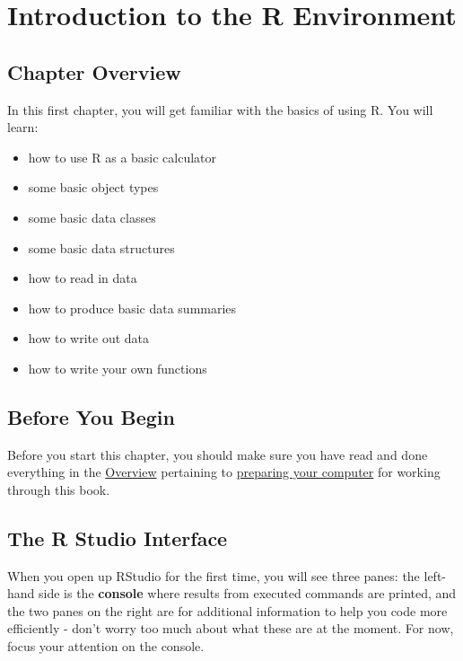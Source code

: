 \documentclass[]{book}
\providecommand{\tightlist}{%
  \setlength{\itemsep}{0pt}\setlength{\parskip}{0pt}}
\begin{document}
\hypertarget{ch1}{%
\chapter{Introduction to the R Environment}\label{ch1}}

\hypertarget{chapter-overview}{%
\section*{Chapter Overview}\label{chapter-overview}}

In this first chapter, you will get familiar with the basics of using R. You will learn:

\begin{itemize}
\tightlist
\item
  how to use R as a basic calculator
\item
  some basic object types
\item
  some basic data classes
\item
  some basic data structures
\item
  how to read in data
\item
  how to produce basic data summaries
\item
  how to write out data
\item
  how to write your own functions
\end{itemize}

\hypertarget{before-you-begin}{%
\section*{Before You Begin}\label{before-you-begin}}

Before you start this chapter, you should make sure you have read and done everything in the \protect\hyperlink{overview}{Overview} pertaining to \protect\hyperlink{comp-prep}{preparing your computer} for working through this book.

\hypertarget{the-r-studio-interface}{%
\section{The R Studio Interface}\label{the-r-studio-interface}}

When you open up RStudio for the first time, you will see three panes: the left-hand side is the \textbf{console} where results from executed commands are printed, and the two panes on the right are for additional information to help you code more efficiently - don't worry too much about what these are at the moment. For now, focus your attention on the console.
\end{document}
